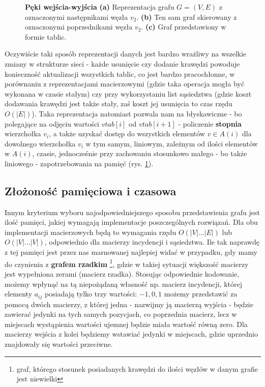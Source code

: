 \begin{figure}[!htbp]
\begin{subfigure}[b]{0.50\textwidth}
		\caption{}
	\end{subfigure}
	\caption{\textbf{Pęki wejścia-wyjścia} \textbf{(a)} Reprezentacja grafu $G = \left( V, E \right)$ z oznaczonymi następnikami węzła $v_{2}$. \textbf{(b)} Ten sam graf skierowany z oznaczonymi poprzednikami węzła $v_{2}$. \textbf{(c)} Graf przedstawiony w formie tablic.}\label{fig:forwardReverseStarRepresentation}
\end{figure}

Oczywiście taki sposób reprezentacji danych jest bardzo wrażliwy na wszelkie zmiany w strukturze sieci - każde usunięcie czy dodanie krawędzi powoduje konieczność aktualizacji wszystkich tablic, co jest bardzo pracochłonne, w porównaniu z reprezentacjami macierzowymi (gdzie taka operacja mogła być wykonana w czasie stałym) czy przy wykorzystaniu list sąsiedztwa (gdzie koszt dodawania krawędzi jest także stały, zaś koszt jej usunięcia to czas rzędu $ O \left( \left| E \right| \right) $). Taka reprezentacja natomiast pozwala nam na błyskawiczne - bo polegające na odjęciu wartości $vtab \left[ i \right] $ od $vtab \left[ i+1 \right] $ - policzenie \textbf{stopnia} wierzchołka $v_{i}$, a także uzyskać dostęp do wszystkich elementów $ v \in A \left( i \right) $ dla dowolnego wierzchołka $v_{i}$ w tym samym, liniowym, zależnym od ilości elementów w $A \left( i \right) $, czasie, jednocześnie przy zachowaniu stosunkowo małego - bo także liniowego - zapotrzebowania na pamięć (rys. \ref{fig:forwardReverseStarRepresentation}).

\subsection{Złożoność pamięciowa i czasowa}

Innym kryterium wyboru najodpowiedniejszego sposobu przedstawienia grafu jest ilość pamięci, jakiej wymagają implementacje poszczególnych rozwiązań. Dla obu implementacji macierzowych będą to wymagania rzędu $O \left( \left| V \right| \ldots \left| E \right| \right)$ lub $O \left( \left| V \right| \ldots \left| V \right| \right)$, odpowiednio dla macierzy incydencji i sąsiedztwa. Ile tak naprawdę z tej pamięci jest przez nas marnowanej najlepiej widać w przypadku, gdy mamy do czynienia z \textbf{grafem rzadkim} \footnote{graf, którego stosunek posiadanych krawędzi do ilości węzłów w danym grafie jest niewielki}, gdzie w takiej sytuacji większość macierzy jest wypełniona zerami (macierz rzadka). Stosując odpowiednie kodowanie, możemy wpłynąć na tą niepożądaną własność np. macierz incydencji, której elementy $a_{ij}$ posiadają tylko trzy wartości: $-1, 0, 1$ możemy przedstawić za pomocą dwóch macierzy, z której jedna - nazwijmy ją macierzą wyjścia - będzie zawierać jedynki na tych samych pozycjach, co poprzednia macierz, lecz w miejscach wystąpienia wartości ujemnej będzie miała wartość równą zero. Dla macierzy wejścia z kolei będziemy wstawiać jedynki w miejscach, gdzie uprzednio znajdowały się wartości przeciwne.

